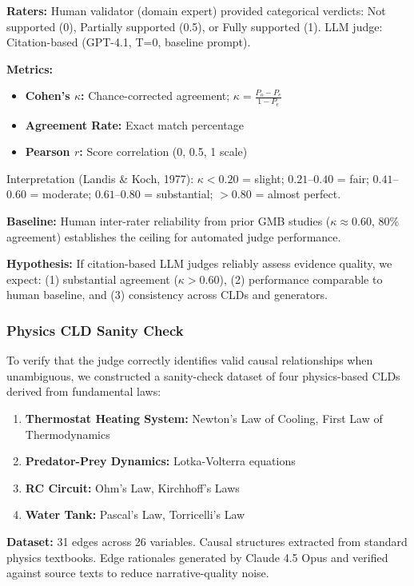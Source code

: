 \textbf{Raters:} Human validator (domain expert) provided categorical verdicts: Not supported (0), Partially supported (0.5), or Fully supported (1). LLM judge: Citation-based (GPT-4.1, T=0, baseline prompt).

\textbf{Metrics:}
\begin{itemize}[noitemsep]
    \item \textbf{Cohen's $\kappa$:} Chance-corrected agreement; $\kappa = \frac{P_o - P_e}{1 - P_e}$
    \item \textbf{Agreement Rate:} Exact match percentage
    \item \textbf{Pearson $r$:} Score correlation (0, 0.5, 1 scale)
\end{itemize}
Interpretation (Landis \& Koch, 1977): $\kappa < 0.20$ = slight; $0.21$--$0.40$ = fair; $0.41$--$0.60$ = moderate; $0.61$--$0.80$ = substantial; $> 0.80$ = almost perfect.

\textbf{Baseline:} Human inter-rater reliability from prior GMB studies ($\kappa \approx 0.60$, 80\% agreement) establishes the ceiling for automated judge performance.

\textbf{Hypothesis:} If citation-based LLM judges reliably assess evidence quality, we expect: (1) substantial agreement ($\kappa > 0.60$), (2) performance comparable to human baseline, and (3) consistency across CLDs and generators.

\subsubsection{Physics CLD Sanity Check}
\label{sec:physics_validation}

To verify that the judge correctly identifies valid causal relationships when unambiguous, we constructed a sanity-check dataset of four physics-based CLDs derived from fundamental laws:
\begin{enumerate}[noitemsep]
    \item \textbf{Thermostat Heating System:} Newton's Law of Cooling, First Law of Thermodynamics
    \item \textbf{Predator-Prey Dynamics:} Lotka-Volterra equations
    \item \textbf{RC Circuit:} Ohm's Law, Kirchhoff's Laws
    \item \textbf{Water Tank:} Pascal's Law, Torricelli's Law
\end{enumerate}

\textbf{Dataset:} 31 edges across 26 variables. Causal structures extracted from standard physics textbooks. Edge rationales generated by Claude 4.5 Opus and verified against source texts to reduce narrative-quality noise.

